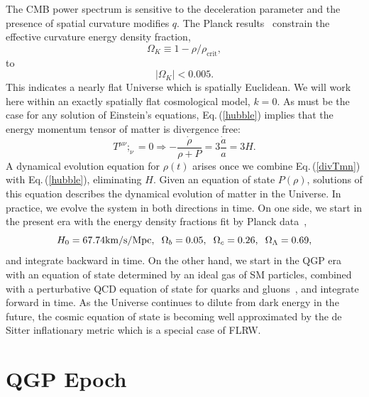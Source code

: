 \documentclass[universe,article,submit,moreauthors,pdftex,a4paper]{Definitions/mdpi}
\newcommand{\beqn}{\begin{equation}}
\newcommand{\eeqn}{\end{equation}}
\newcommand{\req}[1]{Eq.\,(\ref{#1})}
\begin{document}
The CMB power spectrum is sensitive to the deceleration parameter and the presence of spatial curvature modifies $q$. The Planck results~\cite{Planck:2013pxb,Planck:2015fie,Planck:2018vyg} constrain the effective curvature energy density fraction,
\begin{equation}
\Omega_K\equiv1-\rho/\rho_{\text{crit}},
\end{equation}
to
\begin{equation}
|\Omega_K|<0.005.
\end{equation}
This indicates a nearly flat Universe which is spatially Euclidean. We will work here within an exactly spatially flat cosmological model, $k=0$. 
As must be the case for any solution of Einstein's equations, \req{hubble} implies that the energy momentum tensor of matter is divergence free:
\beqn\label{divTmn}
T^{\mu\nu};_\nu =0 \Rightarrow -\frac{\dot\rho}{\rho+P}=3\frac{\dot a}{a}=3H.
\eeqn
A dynamical evolution equation for $\rho(t)$ arises once we combine \req{divTmn} with \req{hubble}, eliminating $H$. Given an equation of state $P(\rho)$, solutions of this equation describes the dynamical evolution of matter in the Universe. In practice, we evolve the system in both directions in time. On one side, we start in the present era with the energy density fractions fit by Planck data~\cite{Planck:2013pxb},
\begin{equation}\label{Planck_params}
H_0=67.74\text{km/s/Mpc},\hspace{2mm} \Omega_b=0.05,\hspace{2mm} \Omega_c=0.26, \hspace{2mm}\Omega_\Lambda=0.69,
\end{equation}
and integrate backward in time. On the other hand, we start in the QGP era with an equation of state determined by an ideal gas of SM particles, combined with a perturbative QCD equation of state for quarks and gluons~\cite{Borsanyi:2013bia}, and integrate forward in time. As the Universe continues to dilute from dark energy in the future, the cosmic equation of state is becoming well approximated by the de Sitter inflationary metric which is a special case of FLRW.

\section{QGP Epoch}\label{sec:QGP}
\end{document}
